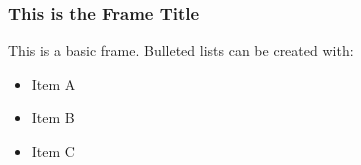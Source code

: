 \begin{frame}
  \frametitle{This is the Frame Title}
  
  This is a basic frame. Bulleted lists can be created with:
  \begin{itemize}
    \item{Item A}
    \item{Item B}
    \item{Item C}
  \end{itemize}

\end{frame}
